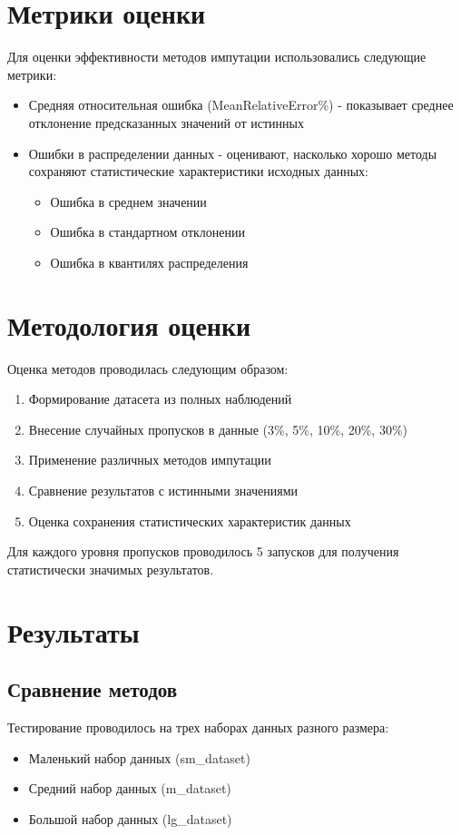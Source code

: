 \documentclass[12pt,a4paper]{article}
\begin{document}
\section{Метрики оценки}
Для оценки эффективности методов импутации использовались следующие метрики:
\begin{itemize}
    \item Средняя относительная ошибка (MeanRelativeError\%) - показывает среднее отклонение предсказанных значений от истинных
    \item Ошибки в распределении данных - оценивают, насколько хорошо методы сохраняют статистические характеристики исходных данных:
    \begin{itemize}
        \item Ошибка в среднем значении
        \item Ошибка в стандартном отклонении
        \item Ошибка в квантилях распределения
    \end{itemize}
\end{itemize}

\section{Методология оценки}
Оценка методов проводилась следующим образом:
\begin{enumerate}
    \item Формирование датасета из полных наблюдений
    \item Внесение случайных пропусков в данные (3\%, 5\%, 10\%, 20\%, 30\%)
    \item Применение различных методов импутации
    \item Сравнение результатов с истинными значениями
    \item Оценка сохранения статистических характеристик данных
\end{enumerate}

Для каждого уровня пропусков проводилось 5 запусков для получения статистически значимых результатов.

\section{Результаты}
\subsection{Сравнение методов}
Тестирование проводилось на трех наборах данных разного размера:
\begin{itemize}
    \item Маленький набор данных (sm\_dataset)
    \item Средний набор данных (m\_dataset)
    \item Большой набор данных (lg\_dataset)
\end{itemize}
\end{document}
